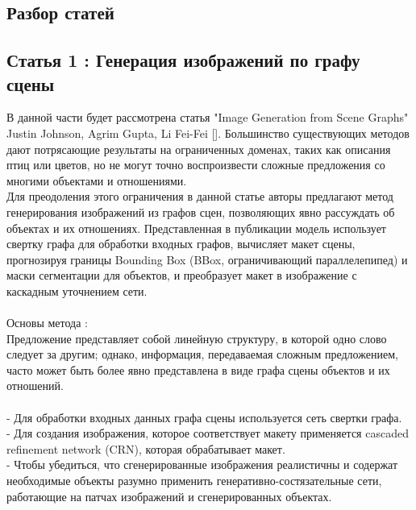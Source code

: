 \documentclass{article}
\begin{document}
    
    \newpage
    \begin{center} 
    \section{Разбор статей}
    \subsection{Статья 1 : Генерация изображений по графу сцены}
    \end{center} 
      \large В данной части будет рассмотрена статья "Image Generation from Scene Graphs" Justin Johnson, Agrim Gupta, Li Fei-Fei []. Большинство существующих методов дают потрясающие результаты на ограниченных доменах, таких
как описания птиц или цветов, но не могут точно воспроизвести
сложные предложения со многими объектами и отношениями.\\
Для преодоления этого ограничения в данной статье авторы предлагают метод
генерирования изображений из графов сцен, позволяющих явно рассуждать об
объектах и их отношениях. Представленная в публикации модель использует свертку графа для
обработки входных графов, вычисляет макет сцены, прогнозируя границы
Bounding Box (BBox, ограничивающий параллелепипед) и маски сегментации для объектов, и преобразует макет в
изображение с каскадным уточнением сети.\\ \\
Основы метода :\\
Предложение представляет собой линейную структуру, в которой одно слово следует за другим; однако,
информация, передаваемая сложным предложением, часто может быть более явно представлена в виде графа сцены
объектов и их отношений.\\ \\
 - Для обработки входных данных графа сцены используется сеть свертки графа.\\
 - Для создания изображения, которое соответствует макету применяется cascaded refinement network (CRN), которая
обрабатывает макет.\\
 - Чтобы убедиться, что сгенерированные изображения реалистичны и содержат необходимые объекты разумно применить
генеративно-состязательные сети, работающие на патчах изображений и сгенерированных объектах.\\
\end{document}

